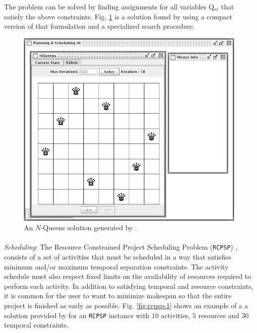 {The problem can be solved by finding assignments for all variables
Q$_{rc}$ that satisfy the above constraints. Fig. \ref{fig:nqueens-2}
is a solution found by \eu using a compact version of that formulation
and a specialized search procedure.

\begin{figure}
\centering
\includegraphics[scale=2.0]{figs/Example-NQueens1.jpeg}
\caption{\small An $N$-Queens solution generated by \eue.}
\label{fig:nqueens-2}
\end{figure}


\paragraph{} \textit{Scheduling}: The Resource Constrained Project
Scheduling Problem (\texttt{RCPSP}) \cite{Bruckera99}, consists of a
set of activities that must be scheduled in a way that satisfies
minimum and/or maximum temporal separation constraints. The activity
schedule must also respect fixed limits on the availability of
resources required to perform each activity. In addition to satisfying
temporal and resource constraints, it is common for the user to want
to minimize makespan \cite{ghallab04} so that the entire project is
finished as early as possible. Fig. \ref{fig:rcpsp-1} shows an example
of a a solution provided by \eu for an \texttt{RCPSP} instance with
$10$ activities, $5$ resources and $30$ temporal constraints.

}
